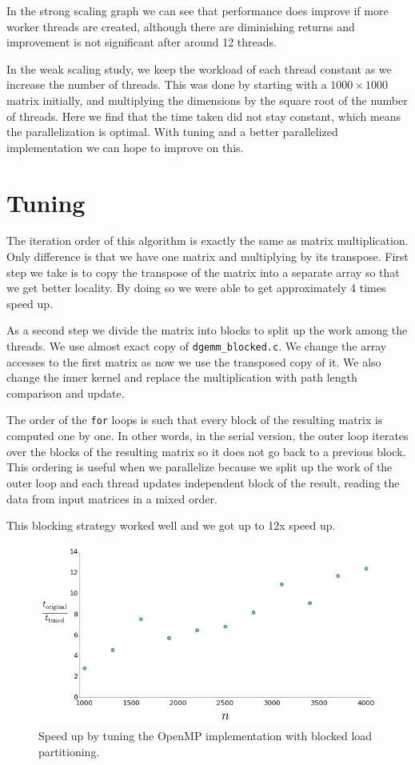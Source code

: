 \documentclass{article}
\begin{document}
In the strong scaling graph we can see that performance does improve if more worker threads are created, although there are diminishing returns and improvement is not significant after around 12 threads.

In the weak scaling study, we keep the workload of each thread constant as we increase the number of threads. This was done by starting with a $1000 \times 1000$ matrix initially, and multiplying the dimensions by the square root of the number of threads. Here we find that the time taken did not stay constant, which means the parallelization is optimal. With tuning and a better parallelized implementation we can hope to improve on this.

\section{Tuning}

The iteration order of this algorithm is exactly the same as matrix multiplication. Only difference is that we have one matrix and multiplying by its transpose. First step we take is to copy the transpose of the matrix into a separate array so that we get better locality. By doing so we were able to get approximately 4 times speed up. 

As a second step we divide the matrix into blocks to split up the work among the threads. We use almost exact copy of \texttt{dgemm\_blocked.c}. We change the array accesses to the first matrix as now we use the transposed copy of it. We also change the inner kernel and replace the multiplication with path length comparison and update.

The order of the \texttt{for} loops is such that every block of the resulting matrix is computed one by one. In other words, in the serial version, the outer loop iterates over the blocks of the resulting matrix so it does not go back to a previous block. This ordering is useful when we parallelize because we split up the work of the outer loop and each thread updates independent block of the result, reading the data from input matrices in a mixed order.

This blocking strategy worked well and we got up to 12x speed up. 

 \begin{figure}[h]
  \centering
  \includegraphics[width=0.7\linewidth]{tunedPerformance.png}
  \caption{Speed up by tuning the OpenMP implementation with blocked load partitioning.}
  \label{tunedPerformance}
\end{figure}
\end{document}
